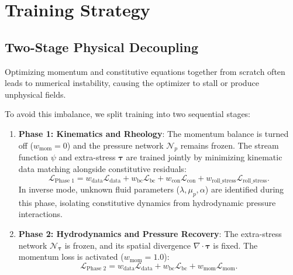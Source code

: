 \section{Training Strategy}
\label{sec:training_strategy}

\subsection{Two-Stage Physical Decoupling}
\label{subsec:two_stage_decoupling_helmholtz}

Optimizing momentum and constitutive equations together from scratch often leads
to numerical instability, causing the optimizer to stall or produce unphysical fields.

To avoid this imbalance, we split training into two sequential stages:
\begin{enumerate}
    \item \textbf{Phase 1: Kinematics and Rheology}:
        The momentum balance is turned off ($w_{\mathrm{mom}} = 0$) and the
        pressure network $\mathcal{N}_p$ remains frozen. The stream function
        $\psi$ and extra-stress $\boldsymbol{\tau}$ are trained jointly by
        minimizing kinematic data matching alongside constitutive residuals:
        \begin{equation}
            \mathcal{L}_{\text{Phase 1}} = w_{\mathrm{data}} \mathcal{L}_{\mathrm{data}} + w_{\mathrm{bc}} \mathcal{L}_{\mathrm{bc}} + w_{\mathrm{con}} \mathcal{L}_{\mathrm{con}} + w_{\mathrm{roll\_stress}} \mathcal{L}_{\mathrm{roll\_stress}} .
            \label{eq:loss_phase1_formula}
        \end{equation}
        In inverse mode, unknown fluid parameters ($\lambda, \mu_p, \alpha$) are
        identified during this phase, isolating constitutive dynamics from
        hydrodynamic pressure interactions.
    \item \textbf{Phase 2: Hydrodynamics and Pressure Recovery}:
        The extra-stress network $\mathcal{N}_{\boldsymbol{\tau}}$ is frozen, and
        its spatial divergence $\nabla \cdot \boldsymbol{\tau}$ is fixed.
        The momentum loss is activated ($w_{\mathrm{mom}} = 1.0$):
        \begin{equation}
            \mathcal{L}_{\text{Phase 2}} = w_{\mathrm{data}} \mathcal{L}_{\mathrm{data}} + w_{\mathrm{bc}} \mathcal{L}_{\mathrm{bc}} + w_{\mathrm{mom}} \mathcal{L}_{\mathrm{mom}} .
            \label{eq:loss_phase2_formula}
        \end{equation}
\end{enumerate}

